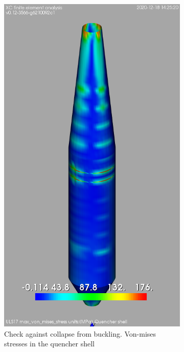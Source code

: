 \documentclass[a4paper,11pt ]{xc_webpage_project}
\begin{document}
\begin{figure}[h]
\begin{subfigure}[b]{0.25\textwidth}
  \includegraphics[width=\textwidth]{figures/vm_quencher_shell_buckling}
  \caption{Check against collapse from buckling.  Von-mises stresses in the quencher shell}
  \end{subfigure}
\hfill
  \begin{subfigure}[b]{0.30\textwidth}
  \centering

\end{subfigure}
\end{figure}
\end{document}
